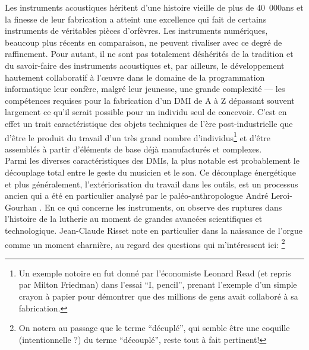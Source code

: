 \noindent Les instruments acoustiques héritent d'une histoire vieille de plus de 40~000ans \cite{conard_new_2009} et la finesse de leur fabrication a atteint une excellence qui fait de certains instruments de véritables pièces d'orfèvres. Les instruments numériques, beaucoup plus récents en comparaison, ne peuvent rivaliser avec ce degré de raffinement. Pour autant, il ne sont pas totalement déshérités de la tradition et du savoir-faire des instruments acoustiques et, par ailleurs, le développement hautement collaboratif à l'œuvre dans le domaine de la programmation informatique leur confère, malgré leur jeunesse, une grande complexité — les compétences requises pour la fabrication d'un \gls{DMI} de A à Z dépassant souvent largement ce qu'il serait possible pour un individu seul de concevoir. C'est en effet un trait caractéristique des objets techniques de l'ère post-industrielle que d'être le produit du travail d'un très grand nombre d'individus\footnote{Un exemple notoire en fut donné par l'économiste Leonard Read (et repris par Milton Friedman) dans l'essai ``I, pencil''\cite{read_i_1958}, prenant l'exemple d'un simple crayon à papier pour démontrer que des millions de gens avait collaboré à sa fabrication.} et d'être assemblés à partir d'éléments de base déjà manufacturés et complexes.\\
\indent Parmi les diverses caractéristiques des \glspl{DMI}, la plus notable est probablement le découplage total entre le geste du musicien et le son. Ce découplage énergétique et plus généralement, l'extériorisation du travail dans les outils, est un processus ancien qui a été en particulier analysé par le paléo-anthropologue André Leroi-Gourhan \cite{leroi-gourhan_geste_1964}. En ce qui concerne les instruments, on observe des ruptures dans l'histoire de la lutherie au moment de grandes avancées scientifiques et technologique. Jean-Claude Risset note en particulier dans \cite{genevois_les_1999} la naissance de l'orgue comme un moment charnière, au regard des questions qui m'intéressent ici: \footnote{On notera au passage que le terme ``décuplé'', qui semble être une coquille (intentionnelle ?) du terme ``découplé'', reste tout à fait pertinent!}\\
